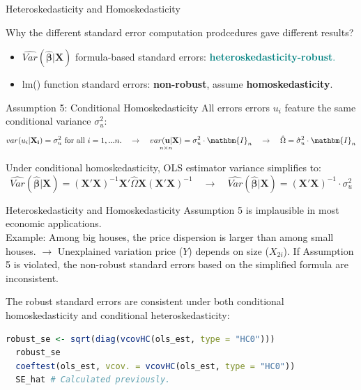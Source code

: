 \documentclass[11pt, aspectratio = 169]{beamer}
\begin{document}
\begin{frame}[fragile]{Heteroskedasticity and Homoskedasticity}

Why the different standard error computation prodcedures gave \alert{different} results?
\pause
\begin{itemize}
  \item $\widehat{Var}(\hat{\boldsymbol{\beta}}|\mathbf{X})$ formula-based standard errors: \textcolor{teal}{\textbf{heteroskedasticity-robust}.}
  \item lm() function standard errors: \color{teal}\textbf{non-robust}, assume \textbf{homoskedasticity}.
\end{itemize}
\pause 

\begin{alertblock}{Assumption 5: Conditional Homoskedasticity}
\vspace{+.12cm}
All errors errors $u_i$ feature \alert{the same} conditional variance $\sigma_u^2$:
$$
var(u_i|\mathbf{X_i}) = \sigma_u^2 \text{ for all } i = 1,...n. 
\quad \rightarrow \quad 
\underset{n \times n}{var(\mathbf{u}|\mathbf{X})}  = \sigma_u^2 \cdot \mathbm{I}_n
\quad \rightarrow \quad
\hat{\Omega} = \hat{\sigma}_u^2 \cdot \mathbm{I}_n
$$
\end{alertblock}
\pause
\vspace{-0.3cm}
Under conditional homoskedasticity, OLS estimator variance simplifies to:
$$
\widehat{Var}(\hat{\boldsymbol{\beta}}|\mathbf{X}) = (\mathbf{X}'\mathbf{X})^{-1}\mathbf{X}'\hat{\Omega}\mathbf{X}(\mathbf{X}'\mathbf{X})^{-1} \quad \rightarrow \quad
\widehat{Var}(\hat{\boldsymbol{\beta}}|\mathbf{X}) = (\mathbf{X}'\mathbf{X})^{-1}\cdot \sigma_u^2
$$
\end{frame}

\begin{frame}[fragile]{Heteroskedasticity and Homoskedasticity}
\alert{Assumption 5 is implausible in most economic applications.} \\
Example: Among big houses, the price dispersion is larger than among small houses. $\rightarrow$ Unexplained variation price ($Y$) depends on size ($X_{2i}$).  
\pause
If \alert{Assumption 5} is violated, the non-robust standard errors based on the simplified formula are inconsistent.

The robust standard errors are consistent under both conditional homoskedasticity  and conditional heteroskedasticity:
\begin{lstlisting}[language=R]      
  robust_se <- sqrt(diag(vcovHC(ols_est, type = "HC0")))
  robust_se
  coeftest(ols_est, vcov. = vcovHC(ols_est, type = "HC0"))
  SE_hat # Calculated previously.
\end{lstlisting}

\end{frame}
\end{document}

